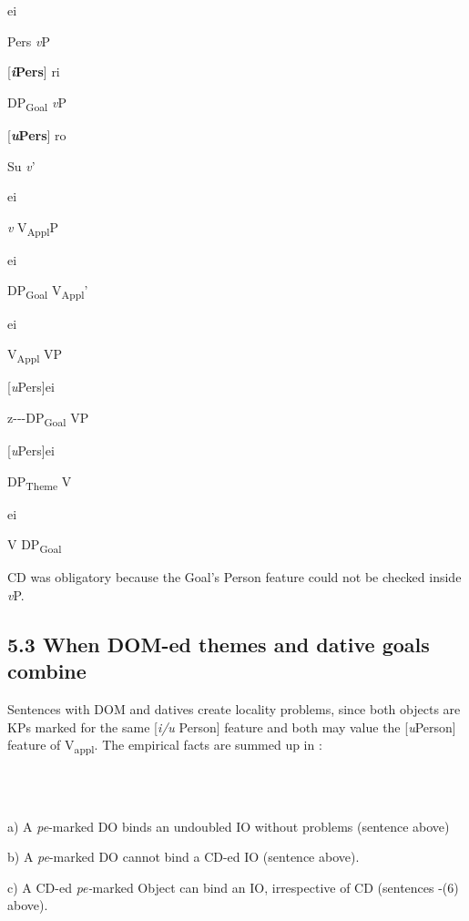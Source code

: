 \documentclass[output=paper,colorlinks,citecolor=brown]{./langscibook}
\begin{document}
ei

Pers    \textit{v}P

[\textbf{\textit{i}}\textbf{Pers}]  ri

  DP\textsubscript{Goal}    \textit{v}P

  [\textbf{\textit{u}}\textbf{Pers}]     ro

    Su    \textit{v}’

      ei

      \textit{v}    V\textsubscript{Appl}P

        ei

        DP\textsubscript{Goal}    V\textsubscript{Appl}’

          ei

          V\textsubscript{Appl}    VP

          [\textit{u}Pers]ei

          z-{}-{}-DP\textsubscript{Goal}    VP

            [\textit{u}Pers]ei

              DP\textsubscript{Theme}  V

                ei

                V  DP\textsubscript{Goal}

CD was obligatory because the Goal’s Person feature could not be checked inside \textit{v}P.

\subsection{\textbf{5.3} \textbf{When} \textbf{DOM-ed} \textbf{themes} \textbf{and} \textbf{dative} \textbf{goals} \textbf{combine}}

Sentences with DOM and datives create locality problems, since both objects are KPs marked for the same [\textit{i/u} Person] feature and both may value the [\textit{u}Person] feature of V\textsubscript{appl}. The empirical facts are summed up in :

\ea%
    \label{ex:key:37}
    \gll\\
        \\
    \glt
    \z

          

a) A \textit{pe}{}-marked DO binds an undoubled IO without problems (sentence  above) 

b) A \textit{pe}{}-marked DO cannot bind a CD-ed IO (sentence  above). 

c) A CD-ed \textit{pe-}marked Object can bind an IO, irrespective of CD (sentences -(6) above). 
\end{document}
